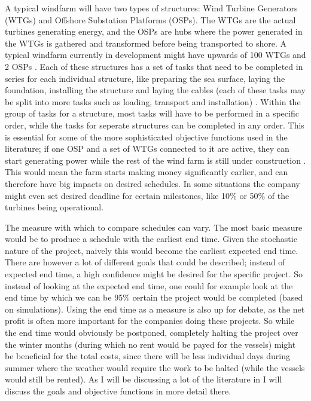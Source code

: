 \documentclass[a4paper,12pt]{article}
\begin{document}
A typical windfarm will have two types of structures: Wind Turbine Generators (WTGs) and Offshore Substation Platforms (OSPs). The WTGs are the actual turbines generating energy, and the OSPs are hubs where the power generated in the WTGs is gathered and transformed before being transported to shore. A typical windfarm currently in development might have upwards of 100 WTGs and 2 OSPs \cite{ruk2017, barlow2018mixed}. Each of these structures has a set of tasks that need to be completed in series for each individual structure, like preparing the sea surface, laying the foundation, installing the structure and laying the cables (each of these tasks may be split into more tasks such as loading, transport and installation) \cite{kerkhove2017optimised}. Within the group of tasks for a structure, most tasks will have to be performed in a specific order, while the tasks for seperate structures can be completed in any order. This is essential for some of the more sophisticated objective functions used in the literature; if one OSP and a set of WTGs connected to it are active, they can start generating power while the rest of the wind farm is still under construction \cite{barlow2017using}. This would mean the farm starts making money significantly earlier, and can therefore have big impacts on desired schedules. In some situations the company might even set desired deadline for certain milestones, like 10\% or 50\% of the turbines being operational. 


The measure with which to compare schedules can vary. The most basic measure would be to produce a schedule with the earliest end time. Given the stochastic nature of the project, naively this would become the earliest expected end time. There are however a lot of different goals that could be described; instead of expected end time, a high confidence might be desired for the specific project. So instead of looking at the expected end time, one could for example look at the end time by which we can be 95\% certain the project would be completed (based on simulations). Using the end time as a measure is also up for debate, as the net profit is often more important for the companies doing these projects. So while the end time would obviously be postponed, completely halting the project over the winter months (during which no rent would be payed for the vessels) might be beneficial for the total costs, since there will be less individual days during summer where the weather would require the work to be halted (while the vessels would still be rented). As I will be discussing a lot of the literature in  I will discuss the goals and objective functions in more detail there. 
\end{document}
